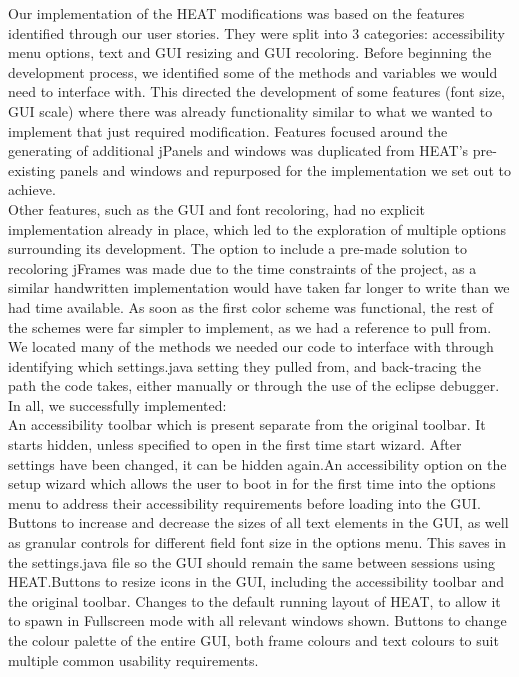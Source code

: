 Our implementation of the HEAT modifications was based on the features identified through our user stories. They were split into 3 categories: accessibility menu options, text and GUI resizing and GUI recoloring. Before beginning the development process, we identified some of the methods and variables we would need to interface with. This directed the development of some features (font size, GUI scale) where there was already functionality similar to what we wanted to implement that just required modification. Features focused around the generating of additional jPanels and windows was duplicated from HEAT’s pre-existing panels and windows and repurposed for the implementation we set out to achieve.  \\

Other features, such as the GUI and font recoloring, had no explicit implementation already in place, which led to the exploration of multiple options surrounding its development. The option to include a pre-made solution to recoloring jFrames was made due to the time constraints of the project, as a similar handwritten implementation would have taken far longer to write than we had time available. As soon as the first color scheme was functional, the rest of the schemes were far simpler to implement, as we had a reference to pull from. We located many of the methods we needed our code to interface with through identifying which settings.java setting they pulled from, and back-tracing the path the code takes, either manually or through the use of the eclipse debugger. In all, we successfully implemented:\\

An accessibility toolbar which is present separate from the original toolbar. It starts hidden, unless specified to open in the first time start wizard. After settings have been changed, it can be hidden again.An accessibility option on the setup wizard which allows the user to boot in for the first time into the options menu to address their accessibility requirements before loading into the GUI. Buttons to increase and decrease the sizes of all text elements in the GUI, as well as granular controls for different field font size in the options menu. This saves in the settings.java file so the GUI should remain the same between sessions using HEAT.Buttons to resize icons in the GUI, including the accessibility toolbar and the original toolbar. Changes to the default running layout of HEAT, to allow it to spawn in Fullscreen mode with all relevant windows shown. Buttons to change the colour palette of the entire GUI, both frame colours and text colours to suit multiple common usability requirements.

